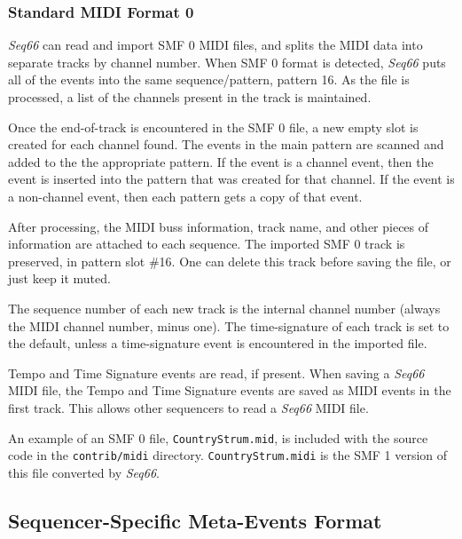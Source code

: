 \subsubsection{Standard MIDI Format 0}
\label{subsubsec:midi_format_smf_0_import}

   \textsl{Seq66} can read and import SMF 0 MIDI files, and splits
   the MIDI data into separate tracks by channel number.
   When SMF 0 format is detected, \textsl{Seq66} puts all of
   the events into the same sequence/pattern, pattern 16.
   As the file is processed, a list of the channels present in the
   track is maintained.

   Once the end-of-track is encountered in the SMF 0 file, a new empty
   slot is created for each channel found.
   The events in the main pattern are scanned and added to the
   the appropriate pattern.  If the event is a channel event,
   then the event is inserted into the pattern that was created for that
   channel.  If the event is a non-channel event, then each pattern gets a
   copy of that event.

   After processing, the MIDI buss information, track name, and other pieces of
   information are attached to each sequence.
   The imported SMF 0 track is preserved, in pattern slot \#16.
   One can delete this track before saving the file, or just keep it muted.

   The sequence number of each new track is the internal channel number
   (always the MIDI channel number, minus one).
   The time-signature of each track is set to the default, unless a
   time-signature event is encountered in the imported file.

   Tempo and Time Signature events are read, if present.
   When saving a \textsl{Seq66} MIDI file,
   the Tempo and Time Signature events are saved as MIDI events in
   the first track.
   This allows other sequencers to read a \textsl{Seq66} MIDI file.

   An example of an SMF 0 file, \texttt{CountryStrum.mid}, is included with
   the source code in the \texttt{contrib/midi} directory.
   \texttt{CountryStrum.midi} is the SMF 1 version of this file converted by
   \textsl{Seq66}.

\subsection{Sequencer-Specific Meta-Events Format}
\label{subsec:midi_format_meta_format}

